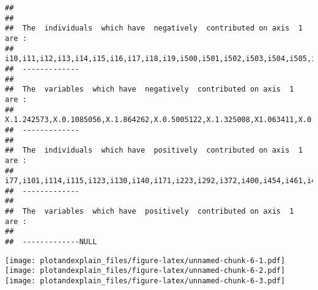 \documentclass[]{article}
\begin{document}
\begin{verbatim}
##  
##  
##  The  individuals  which have  negatively  contributed on axis  1  are :  
##  i10,i11,i12,i13,i14,i15,i16,i17,i18,i19,i500,i501,i502,i503,i504,i505,i506,i507,i508,i509,i510,i511,i512,i513,i514,i515,i516,i517,i518,i519,i520,i521,i522,i523,i524,i525,i526,i527,i528,i529,i530,i531,i532,i533,i534,i535,i536,i537,i538,i539,i540,i541,i542,i543,i544,i545,i546,i547,i548,i549,i550,i551,i552,i553,i554,i555,i556,i557,i558,i559,i560,i561,i562,i563,i564,i565,i566,i567,i568,i569,i570,i571,i572,i573,i574,i575,i576,i577,i578,i579,i580,i581,i582,i583,i584,i585,i586,i587,i588,i589,i590,i591,i592,i593,i594,i595,i596,i597,i598,i599, 
##  ------------- 
##  
##  The  variables  which have  negatively  contributed on axis  1  are :  
##  X.1.242573,X.0.1085056,X.1.864262,X.0.5005122,X.1.325008,X1.063411,X.0.2963712,X.0.1216457,X0.08516605,X0.6241764,X.0.5095915,X.0.2167255,X.0.05550597,X.0.4844491,X.0.5215811,X1.949135,X1.324335,X0.4681471,X1.0611,X1.65597, 
##  ------------- 
##  
##  The  individuals  which have  positively  contributed on axis  1  are :  
##  i77,i101,i114,i115,i123,i130,i140,i171,i223,i292,i372,i400,i454,i461,i493,i610,i612,i621,i688,i735,i763,i764,i767,i880,i953, 
##  ------------- 
##  
##  The  variables  which have  positively  contributed on axis  1  are :  
##   
##  -------------NULL
\end{verbatim}

\texttt{[image: plotandexplain\_files/figure-latex/unnamed-chunk-6-1.pdf]}
\texttt{[image: plotandexplain\_files/figure-latex/unnamed-chunk-6-2.pdf]}
\texttt{[image: plotandexplain\_files/figure-latex/unnamed-chunk-6-3.pdf]}
\end{document}
